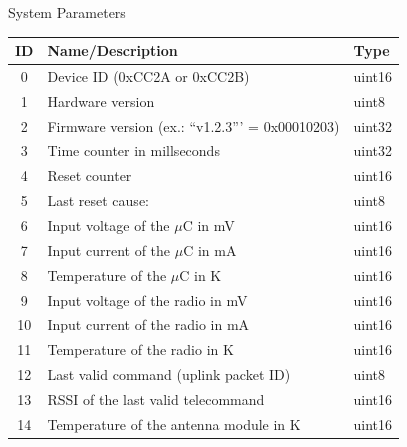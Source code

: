 
\begin{frame}{System Parameters}

\begin{table}[!htb]\tiny
    \centering
    \label{tab:vars-and-pars}
    \begin{tabular}{cll}
        \toprule[1.5pt]
        \textbf{ID} & \textbf{Name/Description} & \textbf{Type}\\
        \midrule
        0   & Device ID (0xCC2A or 0xCC2B)                                      & uint16 \\
        1   & Hardware version                                                  & uint8 \\
        2   & Firmware version (ex.: ``v1.2.3''' = 0x00010203)                  & uint32 \\
        3   & Time counter in millseconds                                       & uint32 \\
        4   & Reset counter                                                     & uint16 \\
        5   & Last reset cause:                                                 & uint8 \\
        6   & Input voltage of the $\mu$C in mV                                 & uint16 \\
        7   & Input current of the $\mu$C in mA                                 & uint16 \\
        8   & Temperature of the $\mu$C in K                                    & uint16 \\
        9   & Input voltage of the radio in mV                                  & uint16 \\
        10  & Input current of the radio in mA                                  & uint16 \\
        11  & Temperature of the radio in K                                     & uint16 \\
        12  & Last valid command (uplink packet ID)                             & uint8 \\
        13  & RSSI of the last valid telecommand                                & uint16 \\
        14  & Temperature of the antenna module in K                            & uint16 \\

\end{tabular}
\end{table}
\end{frame}
